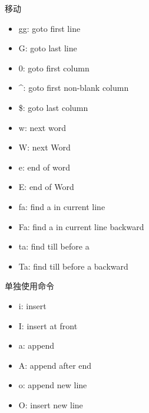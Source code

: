 \documentclass{beamer}
\begin{document}
\begin{frame}[t]{移动}
        \begin{itemize}
            \item gg: goto first line
            \item G: goto last line
            \item 0: goto first column
            \item \^{}: goto first non-blank column
            \item \$: goto last column 
            \item w: next word
            \item W: next Word
            \item e: end of word
            \item E: end of Word
            \item fa: find a in current line
            \item Fa: find a in current line backward
            \item ta: find till before a 
            \item Ta: find till before a backward
        \end{itemize}
\end{frame}
\begin{frame}[t]{单独使用命令}
    \begin{block}
        {}
        \begin{itemize}
            \item i: insert
            \item I: insert at front
            \item a: append
            \item A: append after end
            \item o: append new line
            \item O: insert new line
        \end{itemize}
    \end{block}
\end{frame}
\end{document}

